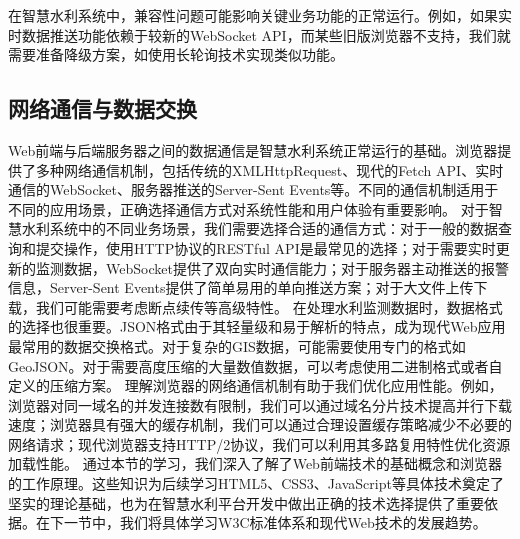 在智慧水利系统中，兼容性问题可能影响关键业务功能的正常运行。例如，如果实时数据推送功能依赖于较新的WebSocket API，而某些旧版浏览器不支持，我们就需要准备降级方案，如使用长轮询技术实现类似功能。 \subsection{网络通信与数据交换}\label{ux7f51ux7edcux901aux4fe1ux4e0eux6570ux636eux4ea4ux6362} Web前端与后端服务器之间的数据通信是智慧水利系统正常运行的基础。浏览器提供了多种网络通信机制，包括传统的XMLHttpRequest、现代的Fetch API、实时通信的WebSocket、服务器推送的Server-Sent Events等。不同的通信机制适用于不同的应用场景，正确选择通信方式对系统性能和用户体验有重要影响。 对于智慧水利系统中的不同业务场景，我们需要选择合适的通信方式：对于一般的数据查询和提交操作，使用HTTP协议的RESTful API是最常见的选择；对于需要实时更新的监测数据，WebSocket提供了双向实时通信能力；对于服务器主动推送的报警信息，Server-Sent Events提供了简单易用的单向推送方案；对于大文件上传下载，我们可能需要考虑断点续传等高级特性。 在处理水利监测数据时，数据格式的选择也很重要。JSON格式由于其轻量级和易于解析的特点，成为现代Web应用最常用的数据交换格式。对于复杂的GIS数据，可能需要使用专门的格式如GeoJSON。对于需要高度压缩的大量数值数据，可以考虑使用二进制格式或者自定义的压缩方案。 理解浏览器的网络通信机制有助于我们优化应用性能。例如，浏览器对同一域名的并发连接数有限制，我们可以通过域名分片技术提高并行下载速度；浏览器具有强大的缓存机制，我们可以通过合理设置缓存策略减少不必要的网络请求；现代浏览器支持HTTP/2协议，我们可以利用其多路复用特性优化资源加载性能。 通过本节的学习，我们深入了解了Web前端技术的基础概念和浏览器的工作原理。这些知识为后续学习HTML5、CSS3、JavaScript等具体技术奠定了坚实的理论基础，也为在智慧水利平台开发中做出正确的技术选择提供了重要依据。在下一节中，我们将具体学习W3C标准体系和现代Web技术的发展趋势。

